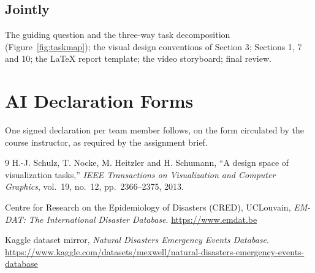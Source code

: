\documentclass[11pt,a4paper]{article}
\begin{document}
\subsection*{Jointly}
The guiding question and the three-way task decomposition
(Figure~\ref{fig:taskmap}); the visual design conventions of Section 3;
Sections 1, 7 and 10; the \LaTeX{} report template; the video storyboard; final
review.


\section{AI Declaration Forms}
\label{sec:ai}

One signed declaration per team member follows, on the form circulated by the
course instructor, as required by the assignment brief.





\begin{thebibliography}{9}
H.-J. Schulz, T. Nocke, M. Heitzler and H. Schumann,
``A design space of visualization tasks,''
\emph{IEEE Transactions on Visualization and Computer Graphics},
vol.~19, no.~12, pp.~2366--2375, 2013.

Centre for Research on the Epidemiology of Disasters (CRED), UCLouvain,
\emph{EM-DAT: The International Disaster Database}.
\url{https://www.emdat.be}

Kaggle dataset mirror, \emph{Natural Disasters Emergency Events Database}.
\url{https://www.kaggle.com/datasets/mexwell/natural-disasters-emergency-events-database}
\end{thebibliography}
\end{document}
